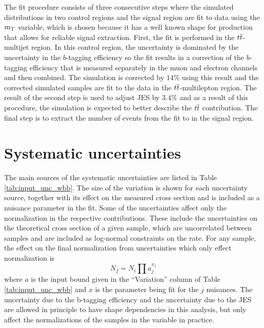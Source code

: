 The fit procedure consists of three consecutive steps
 where the simulated distributions in two control regions
 and the signal region
 are fit to data using the $m_T$ variable,
 which is chosen because it has
 a well known shape for  \wjets production
 that allows for reliable signal extraction.
First, the fit is performed in the $t\overline{t}$-multijet region.
In this control region, the uncertainty is dominated
 by the uncertainty in the $b$-tagging efficiency
 so the fit results in a correction of the
 $b$-tagging efficiency that
 is measured separately in the muon and electron
 channels and then combined. %
The simulation is corrected by $14\%$ using this result
 and the corrected simulated samples are
 fit to the data in the $t\overline{t}$-multilepton region.
The result of the second step is used to adjust JES
 by $3.4\%$
 and as a result of this procedure, the simulation is
 expected to better describe the $t\overline{t}$ contribution.
The final step is to extract the number of
 \wbb events from the fit to \mt in the signal region.

\FloatBarrier


\section{Systematic uncertainties}
\label{sec:systematic_and_statistical_uncertainties}

The main sources of the systematic uncertainties are listed in Table \ref{tab:input_unc_wbb}.
The size of the variation is shown for each uncertainty source,
 together with its effect on the measured cross section
 and is included as a nuisance parameter in the fit.
Some of the uncertainties affect
 only the normalization in the respective contributions.
These include the uncertainties on the
 theoretical cross section of a given sample,
 which are uncorrelated between samples
 and are included as log-normal constraints on the rate.
For any sample, the effect on the final normalization
 from uncertainties which only effect normalization is 
\begin{equation}\label{eq:fitnorm}
N_f = N_i \prod a_{j}^{x_j}
\end{equation}
 where $a$ is the
 input bound given in the ``Variation'' column
 of Table \ref{tab:input_unc_wbb} and $x$ is the
 parameter being fit for the $j$ nuisances.
The uncertainty due to the b-tagging efficiency
 and the uncertainty due to the JES are allowed in
 principle to have shape dependencies in this analysis,
 but only affect the normalizations of the samples
 in the \mt variable in practice.

